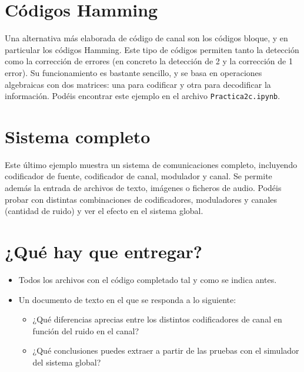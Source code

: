 \documentclass[es,practica]{uah}
\begin{document}
\section{Códigos Hamming}

Una alternativa más elaborada de código de canal son los códigos bloque, y en particular los códigos Hamming. Este tipo de códigos permiten tanto la detección como la corrección de errores (en concreto la detección de 2 y la corrección de 1 error). Su funcionamiento es bastante sencillo, y se basa en operaciones algebraicas con dos matrices: una para codificar y otra para decodificar la información. 
Podéis encontrar este ejemplo en el archivo \texttt{Practica2c.ipynb}.

\section{Sistema completo}

Este último ejemplo muestra un sistema de comunicaciones completo, incluyendo codificador de fuente, codificador de canal, modulador y canal. Se permite además la entrada de archivos de texto, imágenes o ficheros de audio. Podéis probar con distintas combinaciones de codificadores, moduladores y canales (cantidad de ruido) y ver el efecto en el sistema global. 

\section{¿Qué hay que entregar?}

\begin{itemize}
	\item Todos los archivos con el código completado tal y como se indica antes.
	\item Un documento de texto en el que se responda a lo siguiente:
	\begin{itemize}
		\item ¿Qué diferencias aprecias entre los distintos codificadores de canal en función del ruido en el canal?
		\item ¿Qué conclusiones puedes extraer a partir de las pruebas con el simulador del sistema global? 
	\end{itemize}
\end{itemize}


\end{document}
